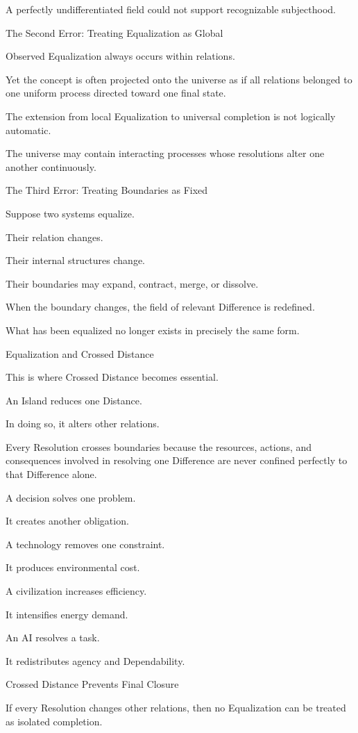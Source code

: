 A perfectly undifferentiated field could not support recognizable subjecthood.

The Second Error: Treating Equalization as Global

Observed Equalization always occurs within relations.

Yet the concept is often projected onto the universe as if all relations belonged to one uniform process directed toward one final state.

The extension from local Equalization to universal completion is not logically automatic.

The universe may contain interacting processes whose resolutions alter one another continuously.

The Third Error: Treating Boundaries as Fixed

Suppose two systems equalize.

Their relation changes.

Their internal structures change.

Their boundaries may expand, contract, merge, or dissolve.

When the boundary changes, the field of relevant Difference is redefined.

What has been equalized no longer exists in precisely the same form.

Equalization and Crossed Distance

This is where Crossed Distance becomes essential.

An Island reduces one Distance.

In doing so, it alters other relations.

Every Resolution crosses boundaries because the resources, actions, and consequences involved in resolving one Difference are never confined perfectly to that Difference alone.

A decision solves one problem.

It creates another obligation.

A technology removes one constraint.

It produces environmental cost.

A civilization increases efficiency.

It intensifies energy demand.

An AI resolves a task.

It redistributes agency and Dependability.

Crossed Distance Prevents Final Closure

If every Resolution changes other relations, then no Equalization can be treated as isolated completion.

